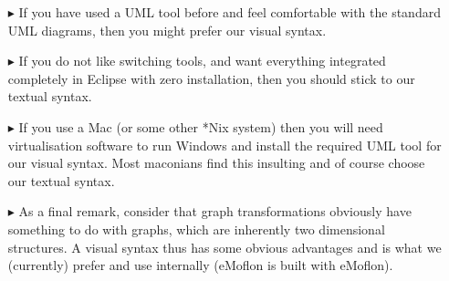 \begin{itemize}

\item[$\blacktriangleright$] If you have used a UML tool before and feel comfortable with the standard UML diagrams, then you might prefer our visual syntax.

\item[$\blacktriangleright$] If you do not like switching tools, and want everything integrated completely in Eclipse with zero installation, then you should stick to our textual syntax.

\item[$\blacktriangleright$] If you use a Mac (or some other *Nix system) then you will need virtualisation software to run Windows and install the required UML
tool for our visual syntax. Most maconians find this insulting and of course choose our textual syntax.

\item[$\blacktriangleright$] As a final remark, consider that graph transformations obviously have something to do with graphs, which are inherently two dimensional structures. 
A visual syntax thus has some obvious advantages and is what we (currently) prefer and use internally (eMoflon is built with eMoflon).

\end{itemize}
